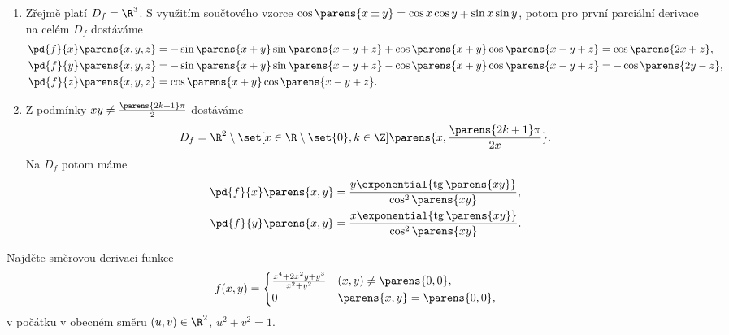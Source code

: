 \documentclass[answers]{exam}
\begin{document}
\begin{questions}
  \begin{solution}
	  \begin{enumerate}[label=(\roman*)]
	  \item 
	  	Zřejmě platí $D_f = \R^3$. S využitím součtového vzorce $\cos\parens{x \pm y} = \cos x \cos y \mp \sin x \sin y$, potom pro první parciální derivace na celém $D_f$ dostáváme
	  	\begin{align*}
	  		\pd{f}{x}\parens{x,y,z}
	  		&=
	  		-\sin\parens{x+y}\sin\parens{x-y+z} + \cos\parens{x+y}\cos\parens{x-y+z}
	  		=
	  		\cos\parens{2x+z},
	  		\\
	  		\pd{f}{y}\parens{x,y,z}
	  		&=
	  		-\sin\parens{x+y}\sin\parens{x-y+z} - \cos\parens{x+y}\cos\parens{x-y+z}
	  		=
	  		-\cos\parens{2y-z},
	  		\\
	  		\pd{f}{z}\parens{x,y,z}
	  		&=
	  		\cos\parens{x+y}\cos\parens{x-y+z}.
	  	\end{align*}
	  
	  \item 
	  	Z podmínky $xy \neq \frac{\parens{2k+1}\pi}{2}$ dostáváme
	  	\begin{equation*}
	  		D_f = \R^2 \setminus \set[x \in \R \setminus \set{0}, k \in \Z]{\parens{x, \frac{\parens{2k+1}\pi}{2x}}}.
	  	\end{equation*}
	  	Na $D_f$ potom máme
	  	\begin{align*}
	  		\pd{f}{x}\parens{x,y}
	  		&=
	  		\frac{y \exponential{{\operatorname{tg} \parens{xy}}}}{\cos^2 \parens{xy}},
	  		\\
	  		\pd{f}{y}\parens{x,y}
	  		&=
	  		\frac{x \exponential{{\operatorname{tg} \parens{xy}}}}{\cos^2 \parens{xy}}.
	  	\end{align*}
		\end{enumerate}
  \end{solution}
  
 	\question
 	Najd\v ete směrovou derivaci funkce 
 	\begin{equation*}
 	f(x,y)
 	=
 	\begin{cases}
 		\frac{x^4+2x^2y+y^3}{x^2+y^2} &(x,y)\ne \parens{0, 0},
 		\\
 		0 &\parens{x,y}=\parens{0,0},
 	\end{cases}
 	\end{equation*}
 	v po\v c\'atku v obecn\'em sm\v eru $(u,v)\in\R^2$, $u^2 + v^2 = 1$.
 	

\end{questions}
\end{document}
